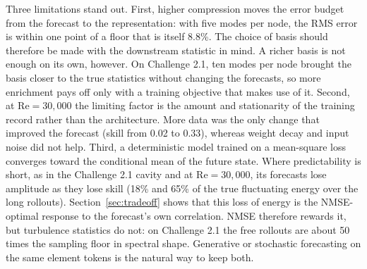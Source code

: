 \documentclass[conf]{new-aiaa}
\newcommand{\Rey}{\mathrm{Re}}
\begin{document}
Three limitations stand out. First, higher compression moves the error budget from the forecast to the representation: with five modes per node, the RMS error is within one point of a floor that is itself 8.8\%. The choice of basis should therefore be made with the downstream statistic in mind. A richer basis is not enough on its own, however. On Challenge 2.1, ten modes per node brought the basis closer to the true statistics without changing the forecasts, so more enrichment pays off only with a training objective that makes use of it. Second, at $\Rey=30{,}000$ the limiting factor is the amount and stationarity of the training record rather than the architecture. More data was the only change that improved the forecast (skill from 0.02 to 0.33), whereas weight decay and input noise did not help. Third, a deterministic model trained on a mean-square loss converges toward the conditional mean of the future state. Where predictability is short, as in the Challenge 2.1 cavity and at $\Rey=30{,}000$, its forecasts lose amplitude as they lose skill (18\% and 65\% of the true fluctuating energy over the long rollouts). Section~\ref{sec:tradeoff} shows that this loss of energy is the NMSE-optimal response to the forecast's own correlation. NMSE therefore rewards it, but turbulence statistics do not: on Challenge 2.1 the free rollouts are about 50 times the sampling floor in spectral shape. Generative or stochastic forecasting on the same element tokens \cite{kohl2023acdm,lippe2023pderefiner} is the natural way to keep both.

\end{document}
